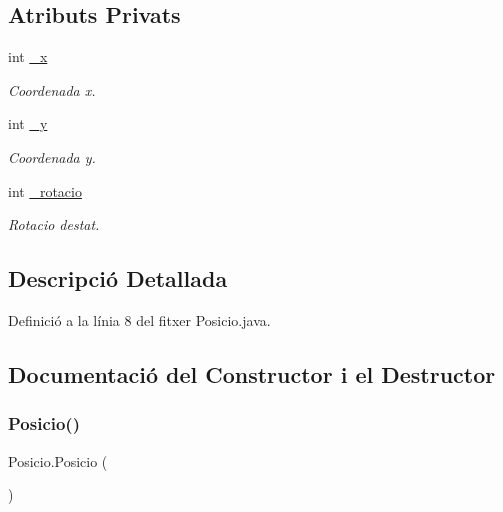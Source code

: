 \subsection*{Atributs Privats}
\begin{DoxyCompactItemize}
\item 
int \mbox{\hyperlink{class_posicio_ad4630c3ac54fee2bb3f16e8199be8dda}{\+\_\+x}}
\begin{DoxyCompactList}\small\item\em Coordenada x. \end{DoxyCompactList}\item 
int \mbox{\hyperlink{class_posicio_a95c50cf40b0f7c5570a516d058122543}{\+\_\+y}}
\begin{DoxyCompactList}\small\item\em Coordenada y. \end{DoxyCompactList}\item 
int \mbox{\hyperlink{class_posicio_afd8482e5bb3de8a1ad2da5143f81b3a5}{\+\_\+rotacio}}
\begin{DoxyCompactList}\small\item\em Rotacio d\textquotesingle{}estat. \end{DoxyCompactList}\end{DoxyCompactItemize}


\subsection{Descripció Detallada}


Definició a la línia 8 del fitxer Posicio.\+java.



\subsection{Documentació del Constructor i el Destructor}
\mbox{\label{class_posicio_ac0f4cc6a7db7c5d1ff6260ef51bd7c25}} 
\subsubsection{\texorpdfstring{Posicio()}{Posicio()}\hspace{0.1cm}{\footnotesize\ttfamily [1/3]}}
{\footnotesize\ttfamily Posicio.\+Posicio (\begin{DoxyParamCaption}{ }\end{DoxyParamCaption})}


